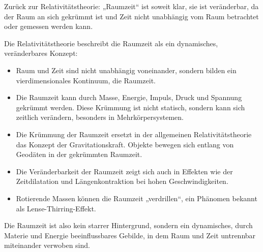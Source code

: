 \documentclass[a4paper,12pt]{article}
\begin{document}
	Zurück zur Relativitätstheorie: „Raumzeit“ ist soweit klar, sie ist veränderbar, da der Raum an sich gekrümmt ist und Zeit nicht unabhängig vom Raum betrachtet oder gemessen werden kann.
	
	Die Relativitätstheorie beschreibt die Raumzeit als ein dynamisches, veränderbares Konzept:
	\begin{itemize}
		\item Raum und Zeit sind nicht unabhängig voneinander, sondern bilden ein vierdimensionales Kontinuum, die Raumzeit.
		\item Die Raumzeit kann durch Masse, Energie, Impuls, Druck und Spannung gekrümmt werden. Diese Krümmung ist nicht statisch, sondern kann sich zeitlich verändern, besonders in Mehrkörpersystemen.
		\item Die Krümmung der Raumzeit ersetzt in der allgemeinen Relativitätstheorie das Konzept der Gravitationskraft. Objekte bewegen sich entlang von Geodäten in der gekrümmten Raumzeit.
		\item Die Veränderbarkeit der Raumzeit zeigt sich auch in Effekten wie der Zeitdilatation und Längenkontraktion bei hohen Geschwindigkeiten.
		\item Rotierende Massen können die Raumzeit „verdrillen“, ein Phänomen bekannt als Lense-Thirring-Effekt.
	\end{itemize}
	Die Raumzeit ist also kein starrer Hintergrund, sondern ein dynamisches, durch Materie und Energie beeinflussbares Gebilde, in dem Raum und Zeit untrennbar miteinander verwoben sind.
	
\end{document}
